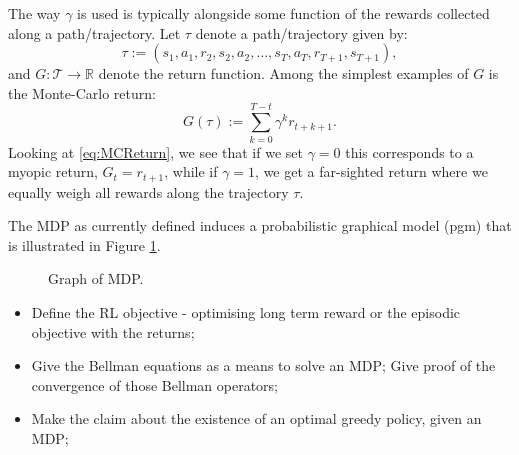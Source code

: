 \documentclass{report}
\newcommand{\reals}{\mbox{\(\mathbb R\)}}
\numberwithin{equation}{section}
\numberwithin{figure}{section}
\numberwithin{table}{section}
\begin{document}
The way $\gamma$ is used is typically alongside some function of 
the rewards collected along a path/trajectory. Let $\tau$ denote a 
path/trajectory given by:
\begin{equation}
  \tau:=(s_1, a_1, r_2, s_2, a_2, \ldots, s_T, a_T, r_{T+1}, s_{T+1}),\label{eq:tau} 
\end{equation} 
and $G:\mathcal{T}\rightarrow \reals$ denote the return 
function. Among the simplest examples of $G$ is the Monte-Carlo 
return:
\begin{equation}
  G(\tau):=\sum_{k=0}^{T-t}\gamma^kr_{t+k+1}.\label{eq:MCReturn}
\end{equation}
Looking at \eqref{eq:MCReturn}, we see that if we set $\gamma=0$ 
this corresponds to a myopic return, $G_t=r_{t+1}$, while if 
$\gamma=1$, we get a far-sighted return where we equally weigh 
all rewards along the trajectory $\tau$.

The MDP as currently defined induces a probabilistic graphical model 
(pgm) that is illustrated in Figure \ref{fig:MDP}.

\begin{figure}[H]
  \centering
  \caption{\label{fig:MDP} Graph of MDP.}
\end{figure}





\begin{itemize}
  \item Define the RL objective - optimising long term reward 
    or the episodic objective with the returns;
  \item Give the Bellman equations as a means to solve an MDP;
    Give proof of the convergence of those Bellman operators;
  \item Make the claim about the existence of an optimal greedy 
    policy, given an MDP;
\end{itemize}
\end{document}
